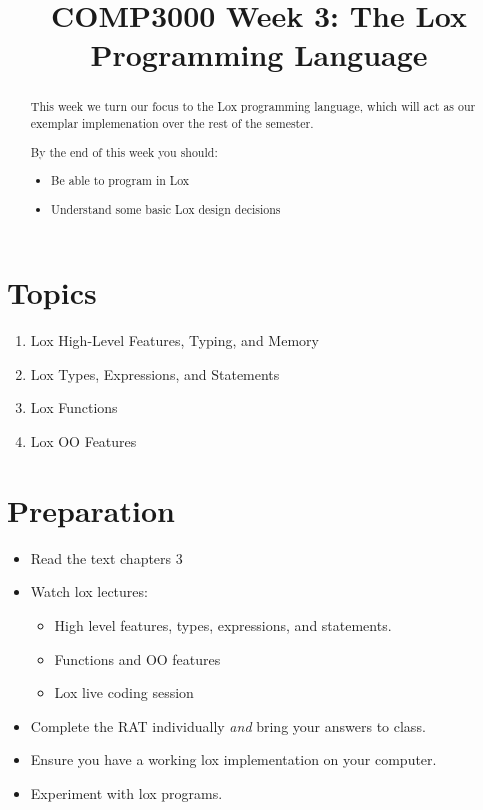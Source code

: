 \documentclass[twoside=false, DIV=14]{scrartcl}
\title{\color{redish} \vspace{-1em}COMP3000 Week 3: The Lox Programming Language}
\begin{document}
{\color{blackish}\maketitle}\vspace{-7em}

\begin{abstract}
This week we turn our focus to the Lox programming language, which will act as our exemplar implemenation over the rest of the semester.  

By the end of this week you should:
\begin{itemize}
    \item Be able to program in Lox
    \item Understand some basic Lox design decisions
\end{itemize}
\end{abstract}

\section*{Topics}
\begin{enumerate}
\item Lox High-Level Features, Typing, and Memory
\item Lox Types, Expressions, and Statements
\item Lox Functions
\item Lox OO Features
\end{enumerate}

\section*{Preparation}
\begin{itemize}
\item Read the text chapters 3
\item Watch lox lectures:
  \begin{itemize}
  \item High level features, types, expressions, and statements.
  \item Functions and OO features
  \item Lox live coding session
  \end{itemize}
\item Complete the RAT individually \emph{and} bring your answers to class.
\item Ensure you have a working lox implementation on your computer.
\item Experiment with lox programs.
\end{itemize}
\end{document}
